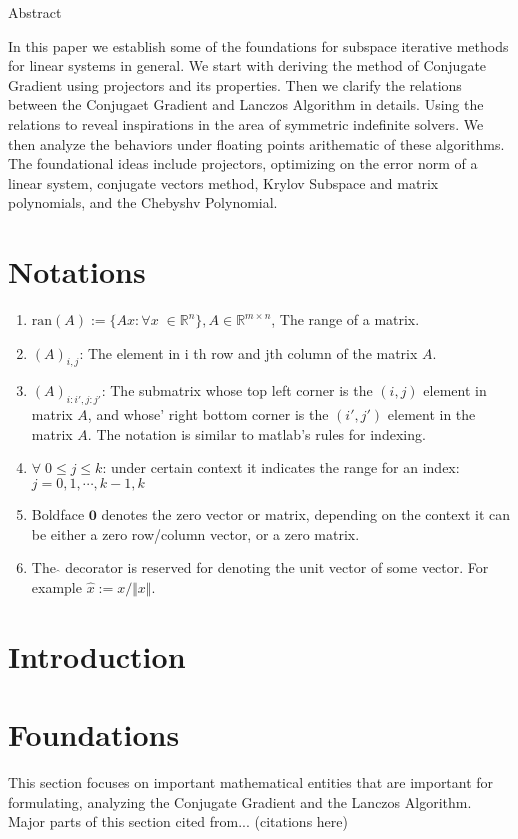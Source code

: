 \documentclass[]{article}
\theoremstyle{definition}
\begin{document}
\tableofcontents
\newpage
\begin{center}
    Abstract
\end{center}
In this paper we establish some of the foundations for subspace iterative methods for linear systems in general. We start with deriving the method of Conjugate Gradient using projectors and its properties. Then we clarify the relations between the Conjugaet Gradient and Lanczos Algorithm in details. Using the relations to reveal inspirations in the area of symmetric indefinite solvers. We then analyze the behaviors under floating points arithematic of these algorithms. The foundational ideas include projectors, optimizing on the error norm of a linear system, conjugate vectors method, Krylov Subspace and matrix polynomials, and the Chebyshv Polynomial. 


\section{Notations}
\begin{enumerate}
    \item $\text{ran}(A):=\{Ax :\forall x \; \in \mathbb R^n\}, A \in \mathbb R^{m\times n}$, The range of a matrix. 
    \item $(A)_{i, j}$: The element in i th row and jth column of the matrix $A$.
    \item $(A)_{i:i', j:j'}$: The submatrix whose top left corner is the $(i, j)$ element in matrix $A$, and whose' right bottom corner is the $(i', j ')$ element in the matrix $A$. The notation is similar to matlab's rules for indexing. 
    \item $\forall\; 0\le j \le k$: under certain context it indicates the range for an index: $j = 0, 1, \cdots, k-1, k$
    \item Boldface $\mathbf 0$ denotes the zero vector or matrix, depending on the context it can be either a zero row/column vector, or a zero matrix.
    \item The $\hat{}$ decorator is reserved for denoting the unit vector of some vector. For example $\hat{x}:= x/\Vert x\Vert$. 
\end{enumerate}
\section{Introduction}


\newpage
\section{Foundations}
    This section focuses on important mathematical entities that are important for formulating, analyzing the Conjugate Gradient and the Lanczos Algorithm. Major parts of this section cited from... (citations here)
\end{document}
